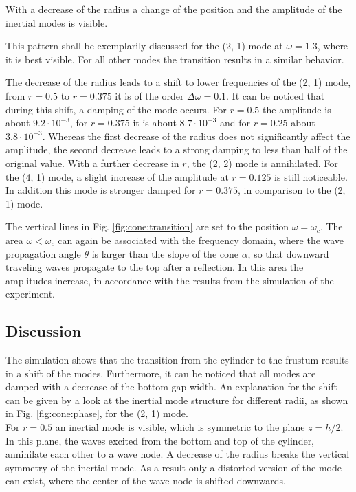 With a decrease of the radius a change of the position and the amplitude of the
inertial modes is visible.

This pattern shall be exemplarily discussed  for the (2, 1) mode at $\omega=1.3$, where it is best visible.
For all other modes the transition results in a similar behavior.

The decrease of the radius leads to a shift to lower frequencies of the (2, 1) mode,
from $r=0.5$ to $r=0.375$ it is of the order $\Delta \omega=0.1$.
It can be noticed that during this shift, a damping of the mode occurs.
For $r=0.5$ the amplitude is about $9.2\cdot10^{-3}$, for $r=0.375$ it is
about $8.7\cdot10^{-3}$ and for $r=0.25$ about $3.8\cdot10^{-3}$.
Whereas the first decrease of the radius does not significantly affect the amplitude,
the second decrease leads to a strong damping to less than half of the original value.
With a further decrease in $r$, the (2, 2) mode is annihilated.
For the (4, 1) mode, a slight increase of the amplitude at $r=0.125$ is still noticeable.
In addition this mode is stronger damped for $r=0.375$, in comparison to the (2, 1)-mode.

The vertical lines in Fig. \ref{fig:cone:transition} are set to the position $\omega=\omega_c$.
The area $\omega<\omega_c$ can again be associated with the frequency domain, where the wave propagation angle $\theta$ is larger than
the  slope of the cone $\alpha$, so that downward traveling waves propagate to the top after a reflection.
In this area the amplitudes increase, in accordance with the
results from the simulation of the experiment.

\subsection{Discussion}%
\label{cone:discussion_transition}

The simulation shows that the transition from the cylinder
to the frustum results in a shift of the modes.
Furthermore, it can be noticed that all modes are damped with a decrease of the bottom gap width.
An explanation for the shift can be given by a look at the inertial mode structure
for different radii, as shown in Fig. \ref{fig:cone:phase}, for the (2, 1) mode.\\
For $r=0.5$ an inertial mode is visible, which is symmetric to the plane $z=h/2$.
In this plane, the waves excited from the bottom and top of the cylinder, annihilate each other to a wave node.
A decrease of the radius breaks the vertical symmetry of the inertial mode.
As a result only a distorted version of the mode can exist, where the center of the wave node
is shifted downwards.

